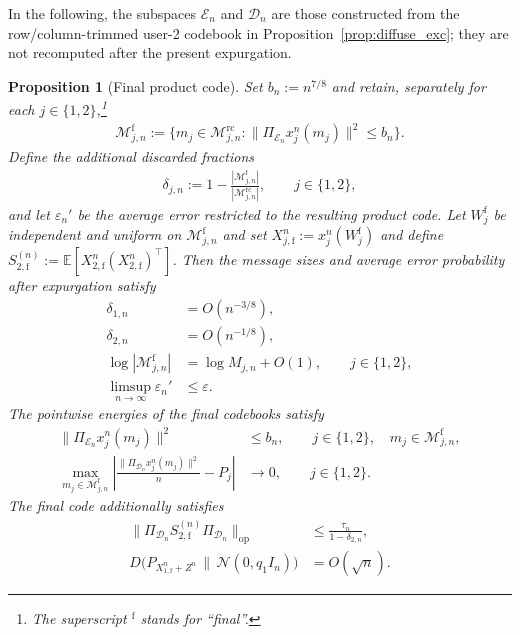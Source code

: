 \documentclass[11pt,onecolumn]{IEEEtran}
\newcommand{\calD}{\mathcal{D}}
\newcommand{\calE}{\mathcal{E}}
\newcommand{\calM}{\mathcal{M}}
\newcommand{\calN}{\mathcal{N}}
\newcommand{\rmf}{\mathrm{f}}
\newcommand{\bbE}{\mathbb{E}}
\newcommand{\eps}{\varepsilon}
\newtheorem{proposition}[theorem]{Proposition}
\newcommand{\rc}{\mathrm{rc}}
\begin{document}
In the following, the subspaces $\calE_n$ and $\calD_n$ are those constructed from the row/column-trimmed user-2 codebook in Proposition~\ref{prop:diffuse_exc}; they are not recomputed after the present expurgation.

\begin{proposition}[Final product code] \label{prop:final}
    Set $b_n:=n^{7/8}$ and retain, separately for each $ j \in \{1,2\}$,\footnote{The superscript $^\rmf$ stands for ``final''.}
    \begin{align}
        \calM_{j,n}^{\rmf} := \big\{ m_j\in \calM_{j,n}^{\rc}: \| \Pi_{\calE_n}x_j^n(m_j) \|^2\le b_n \big\}.
    \end{align}
    Define the additional discarded fractions 
    \begin{align}
        \delta_{j,n}:= 1- \frac{|\calM_{j,n}^{\rmf} |}{ |\calM_{j,n}^{\rc} |},\qquad j \in \{1,2\},
    \end{align}
    and let $\eps_n'$ be the average error restricted to the resulting product code. Let $W_j^{\rmf}$ be independent and uniform on $\calM_{j,n}^{\rmf} $ and set $X_{j,\rmf}^n:= x_j^n(W_j^{\rmf})$ and define $S_{2,\rmf}^{(n)} := \bbE[ X_{2,\rmf}^n(X_{2,\rmf}^n)^\top]$. Then the message sizes and average error probability after expurgation satisfy
    \begin{align}
\delta_{1,n}
    &=O(n^{-3/8}), \label{eqn:retain1}\\
\delta_{2,n}
    &=O(n^{-1/8}),                    \label{eqn:retain2}                  \\
\log|\calM_{j,n}^{\rmf}|
    &=\log M_{j,n}+O(1), \label{eqn:sizef}
\qquad
    j\in\{1,2\},                                       \\
\limsup_{n\to\infty}\eps_n' \label{eqn:error_f}
    &\le\eps.                                           
\end{align}
The pointwise energies of the final codebooks satisfy
\begin{align}
\|\Pi_{\calE_n}x_j^n(m_j)\|^2
    &\le b_n,
    \qquad j\in\{1,2\},\quad
      m_j\in\calM_{j,n}^{\rmf},            \label{eqn:energyE}             \\
\max_{m_j\in\calM_{j,n}^{\rmf}}
\left|
    \frac{\|\Pi_{\calD_n}x_j^n(m_j)\|^2}{n}-P_j
\right|
    &\to 0,
    \qquad  j\in\{1,2\}.  \label{eqn:energyD}
\end{align}
The  final code additionally satisfies
\begin{align}
\big\|
    \Pi_{\calD_n}S_{2,\rmf}^{(n)}\Pi_{\calD_n}
\big\|_{\mathrm{op}}
    &\le\frac{\tau_n}{1-\delta_{2,n}},          \label{eqn:distri1}        \\
D\big(P_{X_{1,\rmf}^n+Z^n} \,\|\, \calN(0,q_1I_n) \big) &=O(\sqrt n).\label{eqn:distri2}
\end{align}
\end{proposition}
\end{document}
